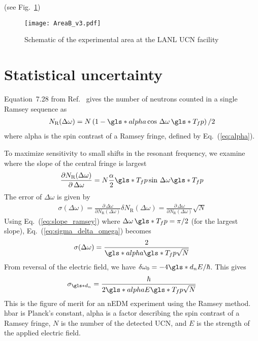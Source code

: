 
(see Fig.~\ref{fig:AreaB_schematic})

\begin{figure}[htp]
    \centering
    \texttt{[image: AreaB\_v3.pdf]}
    \caption{Schematic of the experimental area at the LANL UCN facility}
    \label{fig:AreaB_schematic}
\end{figure}


\section{Statistical uncertainty}\label{sec:figure_of_merit}


Equation~7.28 from Ref.~\cite{golubUCN} gives the number of neutrons counted in a single Ramsey sequence as
%
\begin{gather}
    N_\text{R}(\Delta \omega) = N \left( 1 - \gls*{alpha} \cos \,\Delta \omega \, \gls*{T_fp} \right)/2
\end{gather}
%
where \gls*{alpha} is the spin contrast of a Ramsey fringe, defined by Eq.~(\ref{eq:alpha}). 

To maximize sensitivity to small shifts in the resonant frequency, we examine where the slope of the central fringe is largest
%
\begin{gather}
    \frac{\partial N_\text{R}(\Delta \omega)}{\partial \, \Delta \omega} = N \frac{\alpha}{2} \gls*{T_fp} \sin \, \Delta \omega \gls*{T_fp} \label{eq:slope_ramsey}
\end{gather}
%
The error of $\Delta \omega$ is given by
%
\begin{gather}
    \sigma(\Delta \omega) = \frac{\partial \, \Delta \omega}{\partial N_\text{R}(\Delta \omega)}\delta N_\text{R}(\Delta \omega) = \frac{\partial \, \Delta \omega}{\partial N_\text{R}(\Delta \omega)} \sqrt{N}
    \label{eq:sigma_delta_omega}
\end{gather}
%
Using Eq.~(\ref{eq:slope_ramsey}) where $\Delta \omega \, \gls*{T_fp} = \pi/2$ (for the largest slope), Eq.~(\ref{eq:sigma_delta_omega}) becomes
%
\begin{gather}
    \sigma(\Delta \omega) = \frac{2}{\gls*{alpha} \gls*{T_fp} \sqrt{N}}
\end{gather}
%
From reversal of the electric field, we have $\delta \omega_0 = -4 \gls*{d_n} E / \hbar$.  This gives
%
\begin{gather}
    \sigma_{\gls*{d_n}} = \frac{\hbar}{2\gls*{alpha} E \gls*{T_fp} \sqrt{N}}\label{eq:figure_of_merit}
\end{gather}
%
This is the figure of merit for an nEDM experiment using the Ramsey method. \gls{hbar} is Planck’s constant, \gls{alpha} is a factor describing the spin contrast of a Ramsey fringe, $N$ is the number of the detected UCN, and $E$ is the strength of the applied electric field.

